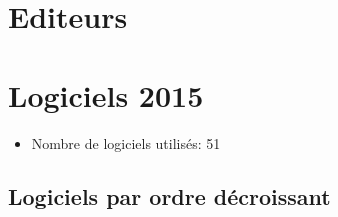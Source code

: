 \documentclass[]{article}
\begin{document}
\section{Editeurs}\label{editeurs}

\section{Logiciels 2015}\label{logiciels-2015}

\begin{itemize}
\itemsep1pt\parskip0pt
\item
  Nombre de logiciels utilisés: 51
\end{itemize}

\subsection{Logiciels par ordre
décroissant}\label{logiciels-par-ordre-decroissant}
\end{document}
